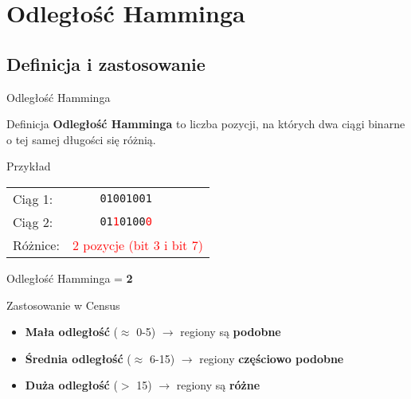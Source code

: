 \documentclass[9pt]{beamer}
\begin{document}
\section{Odległość Hamminga}

\subsection{Definicja i zastosowanie}

\begin{frame}{Odległość Hamminga}
\begin{block}{Definicja}
\textbf{Odległość Hamminga} to liczba pozycji, na których dwa ciągi binarne o tej samej długości się różnią.
\end{block}

\pause

\begin{exampleblock}{Przykład}
\begin{center}
\begin{tabular}{lcl}
Ciąg 1: & \texttt{01001001} & \\
Ciąg 2: & \texttt{01\textcolor{red}{1}0100\textcolor{red}{0}} & \\
\hline
Różnice: & \multicolumn{2}{c}{\textcolor{red}{2 pozycje (bit 3 i bit 7)}} \\
\end{tabular}
\end{center}

Odległość Hamminga = \textbf{2}
\end{exampleblock}

\pause

\begin{block}{Zastosowanie w Census}
\begin{itemize}
\item \textbf{Mała odległość} ($\approx$ 0-5) $\rightarrow$ regiony są \textbf{podobne}
\item \textbf{Średnia odległość} ($\approx$ 6-15) $\rightarrow$ regiony \textbf{częściowo podobne}
\item \textbf{Duża odległość} ($>$ 15) $\rightarrow$ regiony są \textbf{różne}
\end{itemize}
\end{block}

\end{frame}
\end{document}

